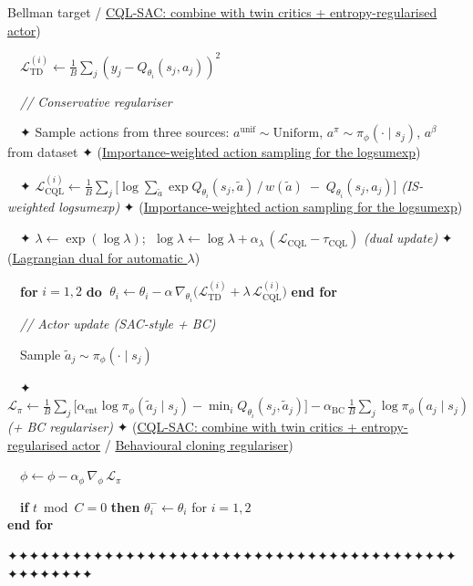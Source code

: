 \documentclass[11pt]{article}
\begin{document}
\begin{pseudobox}
{Bellman target} / \hyperref[trick-4-8-2]{CQL-SAC: combine with twin
critics + entropy-regularised actor})\\
\strut ~~\(\mathcal{L}_{\text{TD}}^{(i)} \leftarrow \frac{1}{B}\sum_j(y_j - Q_{\theta_i}(s_j, a_j))^2\)\\
\strut ~~\emph{// Conservative regulariser}\\
\strut ~~✦ Sample actions from three sources:
\(a^\text{unif}\!\sim\!\mathrm{Uniform}\),
\(a^\pi\!\sim\!\pi_\phi(\cdot\mid s_j)\), \(a^\beta\) from dataset ✦
(\hyperref[trick-4-8-3]{Importance-weighted action sampling for the
logsumexp})\\
\strut ~~✦
\(\mathcal{L}_\text{CQL}^{(i)} \leftarrow \frac{1}{B}\sum_j\bigl[\log\!\sum_{\tilde{a}} \exp Q_{\theta_i}(s_j,\tilde{a})\,/\,w(\tilde{a}) \;-\; Q_{\theta_i}(s_j,a_j)\bigr]\)
\emph{(IS-weighted logsumexp)} ✦
(\hyperref[trick-4-8-3]{Importance-weighted action sampling for the
logsumexp})\\
\strut ~~✦ \(\lambda \leftarrow \exp(\log\lambda)\);
\(\;\log\lambda \leftarrow \log\lambda + \alpha_\lambda\,(\mathcal{L}_\text{CQL} - \tau_\text{CQL})\)
\emph{(dual update)} ✦ (\hyperref[trick-4-8-1]{Lagrangian dual for
automatic \(\lambda\)})\\
\strut ~~\textbf{for} \(i = 1, 2\) \textbf{do}
\(\;\theta_i \leftarrow \theta_i - \alpha\,\nabla_{\theta_i}\bigl(\mathcal{L}_\text{TD}^{(i)} + \lambda\,\mathcal{L}_\text{CQL}^{(i)}\bigr)\)
\textbf{end for}\\
\strut ~~\emph{// Actor update (SAC-style + BC)}\\
\strut ~~Sample \(\tilde{a}_j \sim \pi_\phi(\cdot \mid s_j)\)\\
\strut ~~✦
\(\mathcal{L}_\pi \leftarrow \frac{1}{B}\sum_j\bigl[\alpha_\text{ent}\log\pi_\phi(\tilde{a}_j\mid s_j) - \min_i Q_{\theta_i}(s_j,\tilde{a}_j)\bigr] - \alpha_\text{BC}\,\frac{1}{B}\sum_j\log\pi_\phi(a_j\mid s_j)\)
\emph{(+ BC regulariser)} ✦ (\hyperref[trick-4-8-2]{CQL-SAC: combine
with twin critics + entropy-regularised actor} /
\hyperref[trick-4-8-4]{Behavioural cloning regulariser})\\
\strut ~~\(\phi \leftarrow \phi - \alpha_\phi\, \nabla_{\phi}\, \mathcal{L}_\pi\)\\
\strut ~~\textbf{if} \(t \bmod C = 0\) \textbf{then}
\(\theta_i^{-} \leftarrow \theta_i\) for \(i = 1, 2\)\\
\textbf{end for}

\end{pseudobox}

    ✦✦✦✦✦✦✦✦✦✦✦✦✦✦✦✦✦✦✦✦✦✦✦✦✦✦✦✦✦✦✦✦✦✦✦✦✦✦✦✦✦✦✦✦✦✦✦✦✦✦


    
    
    
\end{document}
